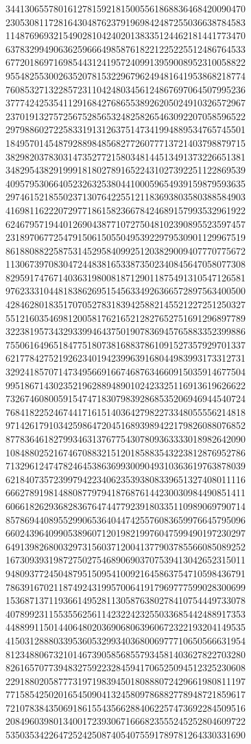 \documentclass[11pt]{article}
\begin{document}
{\begin{verbatim*}
34413065578016127815921815005561868836468420090470
23053081172816430487623791969842487255036638784583
11487696932154902810424020138335124462181441773470
63783299490636259666498587618221225225512486764533
67720186971698544312419572409913959008952310058822
95548255300263520781532296796249481641953868218774
76085327132285723110424803456124867697064507995236
37774242535411291684276865538926205024910326572967
23701913275725675285653248258265463092207058596522
29798860272258331913126375147341994889534765745501
18495701454879288984856827726077713721403798879715
38298203783031473527721580348144513491373226651381
34829543829199918180278916522431027392251122869539
40957953066405232632538044100059654939159879593635
29746152185502371307642255121183693803580388584903
41698116222072977186158236678424689157993532961922
62467957194401269043877107275048102390895523597457
23189706772547915061505504953922979530901129967519
86188088225875314529584099251203829009407770775672
11306739708304724483816533873502340845647058077308
82959174767140363198008187129011875491310547126581
97623331044818386269515456334926366572897563400500
42846280183517070527831839425882145521227251250327
55121603546981200581762165212827652751691296897789
32238195734329339946437501907836945765883352399886
75506164965184775180738168837861091527357929701337
62177842752192623401942399639168044983993173312731
32924185707147349566916674687634660915035914677504
99518671430235219628894890102423325116913619626622
73267460800591547471830798392868535206946944540724
76841822524674417161514036427982273348055556214818
97142617910342598647204516893989422179826088076852
87783646182799346313767754307809363333018982642090
10848802521674670883215120185883543223812876952786
71329612474782464538636993009049310363619763878039
62184073572399794223406235393808339651327408011116
66627891981488087797941876876144230030984490851411
60661826293682836764744779239180335110989069790714
85786944089552990653640447425576083659976645795096
66024396409905389607120198219976047599490197230297
64913982680032973156037120041377903785566085089252
16730939319872750275468906903707539413042652315011
94809377245048795150954100921645863754710598436791
78639167021187492431995700641917969777599028300699
15368713711936614952811305876380278410754449733078
40789923115535562561142322423255033685442488917353
44889911501440648020369068063960672322193204149535
41503128880339536053299340368006977710650566631954
81234880673210146739058568557934581403627822703280
82616570773948327592232845941706525094512325230608
22918802058777319719839450180888072429661980811197
77158542502016545090413245809786882778948721859617
72107838435069186155435662884062257473692284509516
20849603980134001723930671666823555245252804609722
53503534226472524250874054075591789781264330331690
\end{verbatim*}
}
\end{document}
